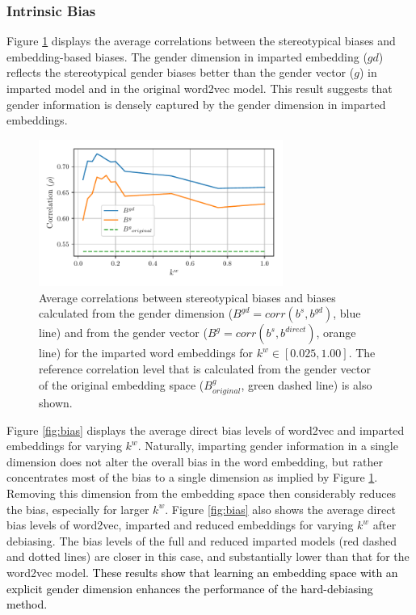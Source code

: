 \documentclass[11pt,a4paper]{article}
\begin{document}
\subsubsection{Intrinsic Bias}

Figure \ref{fig:corr} displays the average correlations
between the stereotypical biases and embedding-based
biases. The gender dimension in imparted embedding ($gd$)
reflects the stereotypical gender biases better than the
gender vector ($g$) in imparted model and in the original
word2vec model. This result suggests that gender information
is densely captured by the gender dimension in imparted
embeddings.

\begin{figure}[h]
 	\centering
	\includegraphics[width=8.0cm]{Figures/gender_correlation.pdf}
	\caption{Average correlations between stereotypical biases and biases calculated from the gender dimension ($B^{gd} = corr(b^s, b^{gd})$, blue line) and from the gender vector ($B^g = corr(b^s, b^{direct})$, orange line) for the imparted word embeddings for $k^w \in [0.025,1.00]$. The reference correlation level that is calculated from the gender vector of the original embedding space ($B^g_{original}$, green dashed line) is also shown.}
	\label{fig:corr}
\end{figure}

 Figure \ref{fig:bias} displays the average direct bias levels of word2vec and imparted embeddings for varying $k^w$. Naturally, imparting gender information in a single dimension does not alter the overall bias in the word embedding, but rather concentrates most of the bias to a single dimension as implied by Figure \ref{fig:corr}. Removing this dimension from the embedding space then considerably reduces the bias, especially for larger $k^w$. Figure \ref{fig:bias} also shows the average direct bias levels of word2vec, imparted and reduced embeddings for varying $k^w$ after debiasing. The bias levels of the full and reduced imparted models (red dashed and dotted lines) are closer in this case, and substantially lower than that for the word2vec model. \textcolor{black}{These results show that learning an embedding space with an explicit gender dimension enhances the performance of the hard-debiasing method.}
\end{document}
